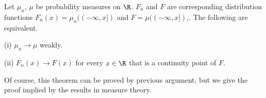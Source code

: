 \begin{theorem}\label{thm:weak_convergence_iff_convergence_in_distribution}
Let $\mu_n$, $\mu$ be probability measures on $\R$. $F_n$ and $F$ are corresponding distribution functions $F_n(x) = \mu_n((-\infty,x])$ and $F = \mu((-\infty,x])$,. The following are equivalent.
\ben
\item [(i)] $\mu_n \to \mu$ weakly.
\item [(ii)] $F_n(x)\to F(x)$ for every $x \in\R$ that is a continuity point of $F$.
\een
\end{theorem}

\begin{remark}
Of course, this theorem can be proved by previous argument, but we give the proof implied by the results in measure theory.
\end{remark}

